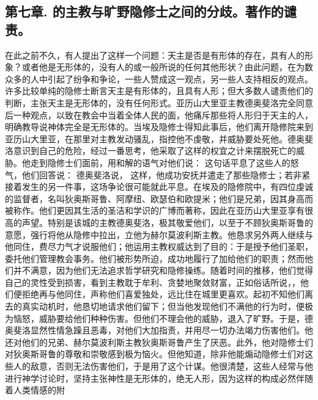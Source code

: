 \subsection{第七章. 的主教与旷野隐修士之间的分歧。著作的谴责。}

在此之前不久，有人提出了这样一个问题：天主是否是有形体的存在，具有人的形象？或者他是无形体的，没有人的或一般所说的任何其他形状？由此问题，在为数众多的人中引起了纷争和争论，一些人赞成这一观点，另一些人支持相反的观点。许多比较单纯的隐修士断言天主是有形体的，且具有人形；但大多数人谴责他们的判断，主张天主是无形体的，没有任何形式。亚历山大里亚主教德奥斐洛完全同意后一种观点，以致在教会中当着全体人民的面，他痛斥那些将人形归于天主的人，明确教导说神体完全是无形体的。\newline{}当埃及隐修士得知此事后，他们离开隐修院来到亚历山大里亚，在那里对主教发动骚乱，指控他不虔敬，并威胁要处死他。德奥斐洛意识到自己的危险，经过一番思考，他采取了这样的权宜之计来摆脱死亡的威胁。他走到隐修士们面前，用和解的语气对他们说： 这句话平息了这些人的怒气，他们回答说： 德奥斐洛说， 这样，他成功安抚并遣走了那些隐修士；若非紧接着发生的另一件事，这场争论很可能就此平息。\newline{}在埃及的隐修院中，有四位虔诚的监督者，名叫狄奥斯哥鲁、阿摩纽、欧瑟伯和欧提米；他们是兄弟，因其身高而被称作。他们更因其生活的圣洁和学识的广博而著称，因此在亚历山大里亚享有很高的声望。特别是该城的主教德奥斐洛，极其敬爱他们，以至于不顾狄奥斯哥鲁的意愿，强行将他从隐修中拉出，立他为赫尔莫波利斯主教。他恳求另外两人继续与他同住，费尽力气才说服他们；他运用主教权威达到了目的：于是授予他们圣职，委托他们管理教会事务。他们被形势所迫，成功地履行了加给他们的职责；然而他们并不满意，因为他们无法追求哲学研究和隐修操练。随着时间的推移，他们觉得自己的灵性受到损害，看到主教耽于牟利、贪婪地聚敛财富，正如俗话所说，，他们便拒绝再与他同住，声称他们喜爱独处，远比住在城里更喜欢。起初不知他们离去的真实动机时，他恳切地请求他们留下；但当他发现他们不满他的行为时，便极为恼怒，威胁要给他们种种伤害。但他们不理会他的威胁，退入了旷野。于是，德奥斐洛显然性情急躁且恶毒，对他们大加指责，并用尽一切办法竭力伤害他们。他还对他们的兄弟、赫尔莫波利斯主教狄奥斯哥鲁产生了厌恶。此外，他对隐修士们对狄奥斯哥鲁的尊敬和崇敬感到极为恼火。\newline{}但他知道，除非他能煽动隐修士们对这些人的敌意，否则无法伤害他们，于是用了这个计谋。他很清楚，这些人经常与他进行神学讨论时，坚持主张神性是无形体的，绝无人形，因为这样的构成必然伴随着人类情感的附